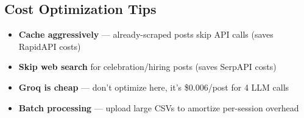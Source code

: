 \documentclass[12pt,a4paper]{article}
\begin{document}
\subsection{Cost Optimization Tips}
\begin{itemize}[leftmargin=1.5em]
    \item \textbf{Cache aggressively} --- already-scraped posts skip API calls (saves RapidAPI costs)
    \item \textbf{Skip web search} for celebration/hiring posts (saves SerpAPI costs)
    \item \textbf{Groq is cheap} --- don't optimize here, it's \$0.006/post for 4 LLM calls
    \item \textbf{Batch processing} --- upload large CSVs to amortize per-session overhead
\end{itemize}
\end{document}
